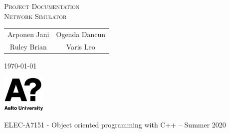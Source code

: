 \thispagestyle{empty}

\hfill
\vspace{12.3cm}
\noindent\begin{center}
    {\Huge \textsc{Project Documentation}}\\
	{\Huge\textsc{Network Simulator}}\\

\vspace{1cm}

\begin{tabular}{cc}
    Arponen Jani & Ogenda Dancun \\
    Ruley Brian & Varis Leo \\
\end{tabular}

\vspace{0.5cm}
\today
\vspace{\fill}

 \begin{minipage}{\linewidth}
      \begin{minipage}{0.25\linewidth}
		  \includegraphics[width=21mm]{Aalto_logo}%
      \end{minipage}
      \hspace{0.05\linewidth}
      \begin{minipage}[t][][b]{0.65\linewidth}
		  \vspace{\fill}
		  \hspace{\fill} ELEC-A7151 - Object oriented programming with C++ -- Summer 2020
      \end{minipage}
\end{minipage}
\date{\today}
\end{center}

\restoregeometry
